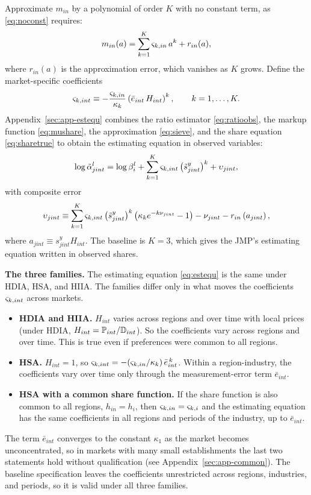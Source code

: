 Approximate $m_{in}$ by a polynomial of order $K$ with no constant term, as \eqref{eq:noconst} requires:
\begin{equation}\label{eq:sieve}
	m_{in}(a) = \sum_{k=1}^{K} \vs_{k,in} \, a^k + r_{in}(a),
\end{equation}
where $r_{in}(a)$ is the approximation error, which vanishes as $K$ grows.
Define the market-specific coefficients
\begin{equation}\label{eq:coefs}
	\vs_{k,int} \equiv -\frac{\vs_{k,in}}{\kappa_k} \left(\bar{e}_{int} \, H_{int}\right)^k, \qquad k = 1, \dots, K.
\end{equation}
Appendix~\ref{sec:app-estequ} combines the ratio estimator \eqref{eq:ratioobs}, the markup function \eqref{eq:mushare}, the approximation \eqref{eq:sieve}, and the share equation \eqref{eq:sharetrue} to obtain the estimating equation in observed variables:
\begin{equation}\label{eq:estequ}
	\log \tilde{\a}^l_{jint} = \log \b^l_i + \sum_{k=1}^{K} \vs_{k,int} \left(\tilde{s}^y_{jint}\right)^k + \upsilon_{jint},
\end{equation}
with composite error
\begin{equation}\label{eq:compositeerror}
	\upsilon_{jint} \equiv \sum_{k=1}^{K} \vs_{k,int} \left(\tilde{s}^y_{jint}\right)^k \left(\kappa_k e^{-k\n_{jint}} - 1\right) - \n_{jint} - r_{in}\left(a_{jint}\right),
\end{equation}
where $a_{jint} \equiv s^y_{jint} H_{int}$.
The baseline is $K = 3$, which gives the JMP's estimating equation written in observed shares.

\textbf{The three families.}
The estimating equation \eqref{eq:estequ} is the same under HDIA, HSA, and HIIA.
The families differ only in what moves the coefficients $\vs_{k,int}$ across markets.
\begin{itemize}
	\item \textbf{HDIA and HIIA.} $H_{int}$ varies across regions and over time with local prices (under HDIA, $H_{int} = \P_{int}/\mathbb{D}_{int}$). So the coefficients vary across regions and over time. This is true even if preferences were common to all regions.
	\item \textbf{HSA.} $H_{int} = 1$, so $\vs_{k,int} = -(\vs_{k,in}/\kappa_k)\, \bar{e}_{int}^{\,k}$. Within a region-industry, the coefficients vary over time only through the measurement-error term $\bar{e}_{int}$.
	\item \textbf{HSA with a common share function.} If the share function is also common to all regions, $h_{in} = h_i$, then $\vs_{k,in} = \vs_{k,i}$ and the estimating equation has the same coefficients in all regions and periods of the industry, up to $\bar{e}_{int}$.
\end{itemize}
The term $\bar{e}_{int}$ converges to the constant $\kappa_1$ as the market becomes unconcentrated, so in markets with many small establishments the last two statements hold without qualification (see Appendix~\ref{sec:app-common}).
The baseline specification leaves the coefficients unrestricted across regions, industries, and periods, so it is valid under all three families.

